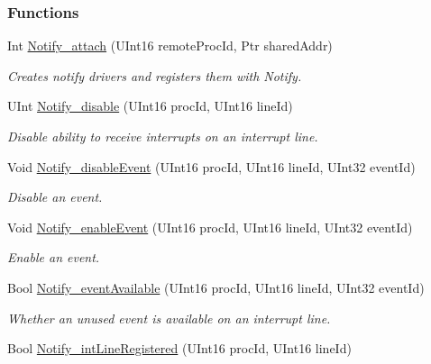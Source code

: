 \subsubsection*{Functions}
\begin{DoxyCompactItemize}
\item 
Int \hyperlink{_notify_8h_a2d6e7fc00357b58ddc2a860e6bd4bf80}{Notify\_\-attach} (UInt16 remoteProcId, Ptr sharedAddr)
\begin{DoxyCompactList}\small\item\em Creates notify drivers and registers them with Notify. \item\end{DoxyCompactList}\item 
UInt \hyperlink{_notify_8h_a0eeb5a2e898a287ec0e31be4e6a92364}{Notify\_\-disable} (UInt16 procId, UInt16 lineId)
\begin{DoxyCompactList}\small\item\em Disable ability to receive interrupts on an interrupt line. \item\end{DoxyCompactList}\item 
Void \hyperlink{_notify_8h_acb0512fe9bdbc30a1bd6d055d3c662d0}{Notify\_\-disableEvent} (UInt16 procId, UInt16 lineId, UInt32 eventId)
\begin{DoxyCompactList}\small\item\em Disable an event. \item\end{DoxyCompactList}\item 
Void \hyperlink{_notify_8h_a701ab77f8cd9b811dcca05e243815b85}{Notify\_\-enableEvent} (UInt16 procId, UInt16 lineId, UInt32 eventId)
\begin{DoxyCompactList}\small\item\em Enable an event. \item\end{DoxyCompactList}\item 
Bool \hyperlink{_notify_8h_a35609c7bf129016087dd520be69c14cf}{Notify\_\-eventAvailable} (UInt16 procId, UInt16 lineId, UInt32 eventId)
\begin{DoxyCompactList}\small\item\em Whether an unused event is available on an interrupt line. \item\end{DoxyCompactList}\item 
Bool \hyperlink{_notify_8h_a696ca01e7ee01649e5685081f6f8a425}{Notify\_\-intLineRegistered} (UInt16 procId, UInt16 lineId)

\end{DoxyCompactItemize}
